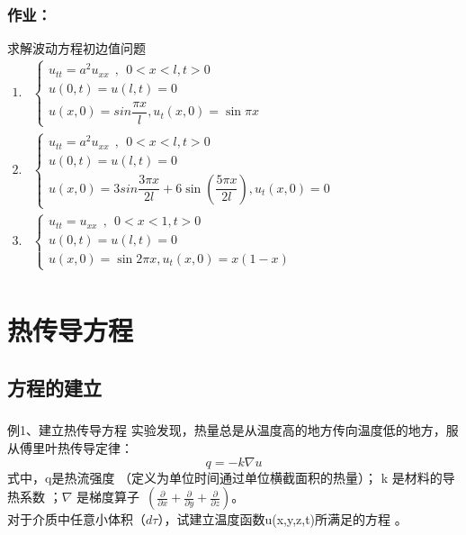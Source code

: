 \begin{frame}
	\frametitle{作业：}	
	求解波动方程初边值问题
	$\begin{array}{lllllllll}
	1. & \begin{cases}
		u_{tt} =a^2u_{xx} ~~,~~ 0<x<l, t>0\\
		u(0,t) =u(l,t)=0 \\
		u(x,0) =sin \dfrac{\pi x}{l} ,  u_t (x,0)=\sin \pi x 
	\end{cases}\\	
	2. &\begin{cases}
		u_{tt} =a^2u_{xx} ~~,~~ 0<x<l, t>0\\
		u(0,t) =u(l,t)=0 \\
		u(x,0) =3sin \dfrac{3\pi x}{2l} +6\sin(\dfrac{5\pi x}{2l}),  u_t (x,0)=0
	\end{cases} \\	
	3. &\begin{cases}
		u_{tt} =u_{xx} ~~,~~ 0<x<1, t>0\\
		u(0,t) =u(l,t)=0  \\
		u(x,0) =\sin 2\pi x ,  u_t (x,0)=x (1-x) 
	\end{cases} \\	
	\end{array}$ \\ 	
\end{frame}	


\section{热传导方程}
\subsection{方程的建立}
\begin{frame}
	\frametitle{}	
	\begin{exampleblock} {例1、建立热传导方程}
		实验发现，热量总是从温度高的地方传向温度低的地方，服从傅里叶热传导定律：
		\begin{equation*}
			q=-k\nabla u
		\end{equation*}
		式中，q是热流强度 （定义为单位时间通过单位横截面积的热量）； k 是材料的导热系数 ；$\nabla $ 是梯度算子~$(\frac{\partial }{\partial x} +\frac{\partial }{\partial y} +\frac{\partial }{\partial z})$。\\
		对于介质中任意小体积（$d\tau $），试建立温度函数u(x,y,z,t)所满足的方程 。\\
		~~~\hspace*{\fill} \\	
	\end{exampleblock}
\end{frame}	

